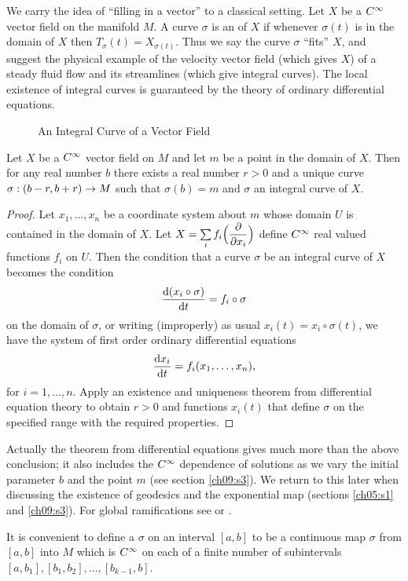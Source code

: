 \documentclass[../main]{subfiles}
\begin{document}
We carry the idea of ``filling in a vector'' to a classical setting. Let $X$ be a $C^\infty$ vector field on the manifold $M$. A curve $\sigma$ is an  of $X$ if whenever $\sigma(t)$ is in the domain of $X$ then $T_\sigma(t)=X_{\sigma(t)}$. Thus we say the curve $\sigma$ ``fits'' $X$, and suggest the physical example of the velocity vector field (which gives $X$) of a steady fluid flow and its streamlines (which give integral curves). The local existence of integral curves is guaranteed by the theory of ordinary differential equations.

\begin{figure}[ht]
    \centering
    \caption{An Integral Curve of a Vector Field}
    \label{fig:an-integral-curve-of-a-vector-field}
\end{figure}



\begin{theorem} \label{thm:ch1.5.1}
Let $X$ be a $C^\infty$ vector field on $M$ and let $m$ be a point in the domain of $X$. Then for any real number $b$ there exists a real number $r>0$ and a unique curve $\sigma:(b-r, b+r) \to M$ such that $\sigma(b)=m$ and $\sigma$ an integral curve of $X$.
\end{theorem}

\begin{proof}
Let $x_1,\dots,x_n$ be a coordinate system about $m$ whose domain $U$ is contained in the domain of $X$. Let $X=\sum\limits_{i} f_{i}\Big(\dfrac{\partial }{\partial x_i}\Big)$ define $C^\infty$ real valued functions $f_i$ on $U$. Then the condition that a curve $\sigma$ be an integral curve of $X$ becomes the condition \[\dfrac{\mathrm{d}(x_i\circ\sigma)}{\mathrm{d}t}=f_i\circ\sigma\] on the domain of $\sigma$, or writing (improperly) as usual $x_i(t)=x_i\circ \sigma(t)$, we have the system of first order ordinary differential equations
\[\dfrac{\mathrm{d}x_i}{\mathrm{d}t}=f_i(x_1,\dots,x_n),\]
for $i=1, \dots, n$. Apply an existence and uniqueness theorem from differential equation theory to obtain $r>0$ and functions $x_{i}(t)$ that define $\sigma$ on the specified range with the required properties.
\end{proof}

Actually the theorem from differential equations gives much more than the above conclusion; it also includes the $C^\infty$ dependence of solutions as we vary the initial parameter $b$ and the point $m$ (see section \ref{ch09:s3}). We return to this later when discussing the existence of geodesics and the exponential map (sections \ref{ch05:s1} and \ref{ch09:s3}). For global ramifications see \cite{palais1957} or \cite{lang2014introduction}.

It is convenient to define a  $\sigma$ on an interval $[a, b]$ to be a continuous map $\sigma$ from $[a, b]$ into $M$ which is $C^\infty$ on each of a finite number of subintervals $[a, b_{1}],[b_{1}, b_{2}], \dots,[b_{k-1}, b]$.
\end{document}
